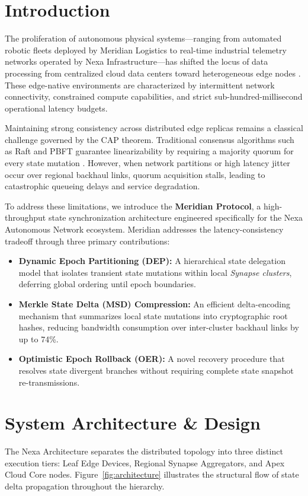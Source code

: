 \documentclass[10pt,a4paper]{article}
\begin{document}
\section{Introduction}
The proliferation of autonomous physical systems---ranging from automated robotic fleets deployed by Meridian Logistics to real-time industrial telemetry networks operated by Nexa Infrastructure---has shifted the locus of data processing from centralized cloud data centers toward heterogeneous edge nodes \cite{Rostova2024}. These edge-native environments are characterized by intermittent network connectivity, constrained compute capabilities, and strict sub-hundred-millisecond operational latency budgets.

Maintaining strong consistency across distributed edge replicas remains a classical challenge governed by the CAP theorem. Traditional consensus algorithms such as Raft and PBFT guarantee linearizability by requiring a majority quorum for every state mutation \cite{Vance2025}. However, when network partitions or high latency jitter occur over regional backhaul links, quorum acquisition stalls, leading to catastrophic queueing delays and service degradation.

To address these limitations, we introduce the \textbf{Meridian Protocol}, a high-throughput state synchronization architecture engineered specifically for the Nexa Autonomous Network ecosystem. Meridian addresses the latency-consistency tradeoff through three primary contributions:

\begin{itemize}
  \item \textbf{Dynamic Epoch Partitioning (DEP):} A hierarchical state delegation model that isolates transient state mutations within local \emph{Synapse clusters}, deferring global ordering until epoch boundaries.
  \item \textbf{Merkle State Delta (MSD) Compression:} An efficient delta-encoding mechanism that summarizes local state mutations into cryptographic root hashes, reducing bandwidth consumption over inter-cluster backhaul links by up to 74\%.
  \item \textbf{Optimistic Epoch Rollback (OER):} A novel recovery procedure that resolves state divergent branches without requiring complete state snapshot re-transmissions.
\end{itemize}

\section{System Architecture \& Design}
The Nexa Architecture separates the distributed topology into three distinct execution tiers: Leaf Edge Devices, Regional Synapse Aggregators, and Apex Cloud Core nodes. Figure~\ref{fig:architecture} illustrates the structural flow of state delta propagation throughout the hierarchy.
\end{document}

